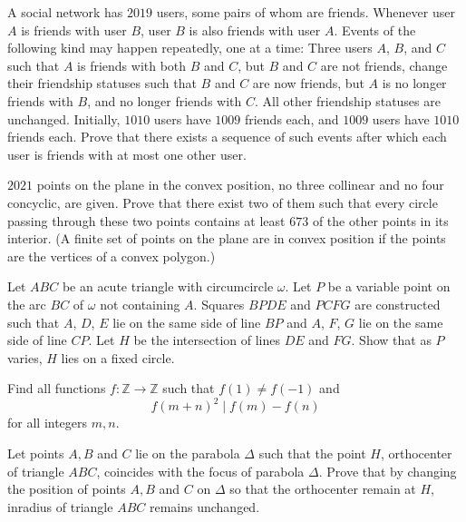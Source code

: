 \documentclass[11pt]{scrartcl}
\begin{document}
\begin{problem}[8690567757444826166]
	A social network has $2019$ users, some pairs of whom are friends. Whenever user $A$ is friends with user $B$, user $B$ is also friends with user $A$. Events of the following kind may happen repeatedly, one at a time:
Three users $A$, $B$, and $C$ such that $A$ is friends with both $B$ and $C$, but $B$ and $C$ are not friends, change their friendship statuses such that $B$ and $C$ are now friends, but $A$ is no longer friends with $B$, and no longer friends with $C$. All other friendship statuses are unchanged.
Initially, $1010$ users have $1009$ friends each, and $1009$ users have $1010$ friends each. Prove that there exists a sequence of such events after which each user is friends with at most one other user.

\end{problem}
\begin{problem}[8700346175921432509]
$2021$ points on the plane in the convex position, no three collinear and no four concyclic, are given. Prove that there exist two of them such that every circle passing through these two points contains at least $673$ of the other points in its interior.
(A finite set of points on the plane are in convex position if the points are the vertices of a convex polygon.)
\end{problem}
\begin{problem}[8700998965901287095]
Let \(ABC\) be an acute triangle with circumcircle \(\omega\). Let \(P\) be a variable point on the arc \(BC\) of \(\omega\) not containing \(A\). Squares \(BPDE\) and \(PCFG\) are constructed such that \(A\), \(D\), \(E\) lie on the same side of line \(BP\) and \(A\), \(F\), \(G\) lie on the same side of line \(CP\). Let \(H\) be the intersection of lines \(DE\) and \(FG\). Show that as \(P\) varies, \(H\) lies on a fixed circle.
\end{problem}
\begin{problem}[8705251856251359603]
Find all functions $f:\mathbb{Z} \rightarrow \mathbb{Z}$ such that $f(1) \neq f(-1)$ and$$f(m+n)^2 \mid f(m)-f(n)$$for all integers $m, n$.
\end{problem}
\begin{problem}[8725820796958956406]
	Let points $A, B$ and $C$ lie on the parabola $\Delta$ such that the point $H$, orthocenter of triangle $ABC$, coincides
with the focus of parabola $\Delta$. Prove that by changing the position of points $A, B$ and $C$ on $\Delta$ so that the orthocenter remain at $H$, inradius of triangle $ABC$ remains unchanged.
\end{problem}
\end{document}
